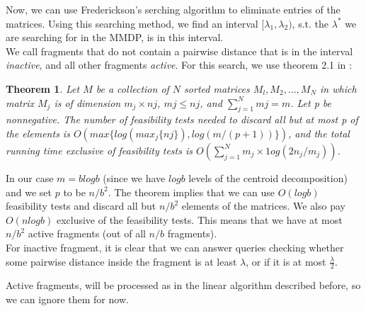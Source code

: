 \documentclass[11pt,a4paper]{article}
\newtheorem{theorem}{Theorem}[section]
\theoremstyle{definition}
\theoremstyle{remark}
\begin{document}
Now, we can use Frederickson's serching algorithm to eliminate entries of the matrices. Using this searching method, we find an interval $[\lambda_1,\lambda_2)$, s.t. the $\lambda^*$ we are searching for in the MMDP, is in this interval.\\
We call fragments that do not contain a pairwise distance that is in the interval \textit{inactive}, and all other fragments \textit{active}.
For this search, we use theorem 2.1 in \cite{Frederickson1991}:
\begin{theorem}
Let $M$ be a collection of $N$ sorted matrices ${M_l, M_2, . . . , M_N}$ in which matrix $M_j$ is of dimension $m_j \times nj$, $mj \leq nj$, and $\sum_{j=1}^{N} mj = m$.
Let p be nonnegative. The number of feasibility tests needed to discard all but at most p of the elements is $O(max \lbrace log (max_j \lbrace nj \rbrace), log(m/(p+ 1)) \rbrace )$, and the total running time exclusive of feasibility tests is $O(\sum_{j=1}^{N} m_j \times 1og(2n_j/m_j))$.
\end{theorem}
In our case $m=blogb$ (since we have $logb$ levels of the centroid decomposition) and we set $p$ to be $n/b^2$. The theorem implies that we can use $O(logb)$ feasibility tests and discard all but $n/b^2$ elements of the matrices. We also pay $O(nlogb)$ exclusive of the feasibility tests. This means that we have at most $n/b^2$ active fragments (out of all $n/b$ fragments). \\
For inactive fragment, it is clear that we can answer queries checking whether some pairwise distance inside the fragment is at least $\lambda$, or if it is at most $\frac{\lambda}{2}$.

Active fragments, will be processed as in the linear algorithm described before, so we can ignore them for now.
\end{document}
